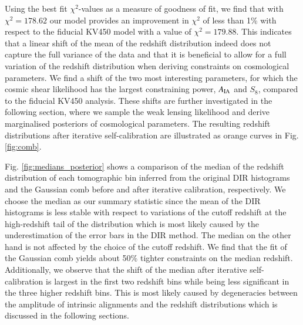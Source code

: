 \documentclass{aa}
\begin{document}
Using the best fit $\chi^2$-values as a measure of goodness of fit, we find that with $\chi^2 = 178.62$ our model provides an improvement in $\chi^2$ of less than 1\% with respect to the fiducial KV450 model with a value of $\chi^2 = 179.88$. This indicates that a linear shift of the mean of the redshift distribution indeed does not capture the full variance of the data and that it is beneficial to allow for a full variation of the redshift distribution when deriving constraints on cosmological parameters. We find a shift of the two most interesting parameters, for which the cosmic shear likelihood has the largest constraining power, $A_{\rm IA}$ and $S_8$, compared to the fiducial KV450 analysis. These shifts are further investigated in the following section, where we sample the weak lensing likelihood and derive marginalised posteriors of cosmological parameters. The resulting redshift distributions after iterative self-calibration are illustrated as orange curves in Fig. \ref{fig:comb}. 

Fig. \ref{fig:medians_posterior} shows a comparison of the median of the redshift distribution of each tomographic bin inferred from the original DIR histograms and the Gaussian comb before and after iterative calibration, respectively. We choose the median as our summary statistic since the mean of the DIR histograms is less stable with respect to variations of the cutoff redshift at the high-redshift tail of the distribution which is most likely caused by the underestimation of the error bars in the DIR method. The median on the other hand is not affected by the choice of the cutoff redshift. We find that the fit of the Gaussian comb yields about 50\% tighter constraints on the median redshift. Additionally, we observe that the shift of the median after iterative self-calibration is largest in the first two redshift bins while being less significant in the three higher redshift bins. This is most likely caused by degeneracies between the amplitude of intrinsic alignments and the redshift distributions which is discussed in the following sections. 
\end{document}
